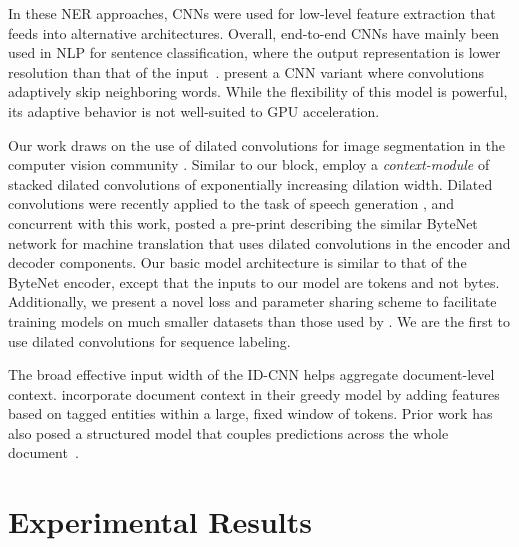 \documentclass[11pt,letterpaper]{article}
\begin{document}
In these NER approaches, CNNs were used for low-level feature extraction that feeds into alternative architectures. Overall, end-to-end CNNs have mainly been used in NLP for sentence classification, where the output representation is lower resolution than that of the input~\citet{kim2014convolutional,kalchbrenner2014convolutional,zhang2015character,toutanova2015representing}. \citet{lei2015molding} present a CNN variant where convolutions adaptively skip neighboring words. While the flexibility of this model is powerful, its adaptive behavior is not well-suited to GPU acceleration. 

Our work draws on the use of dilated convolutions for image segmentation in the computer vision community \citep{yu2015multi,chen2015semantic}. Similar to our block, \citet{yu2015multi} employ a 
\textit{context-module} of stacked dilated convolutions of exponentially increasing dilation width. Dilated convolutions were recently applied to the task of speech generation \citep{vandenoord2016wavenet}, and concurrent with this work, \citet{kalchbrenner2016neural} posted a pre-print describing the similar ByteNet network for machine translation that uses dilated convolutions in the encoder and decoder components. Our basic model architecture is similar to that of the ByteNet encoder, except that the inputs to our model are tokens and not bytes. Additionally, we present a novel loss and parameter sharing scheme to facilitate training models on much smaller datasets than those used by \citet{kalchbrenner2016neural}. We are the first to use dilated convolutions for sequence labeling. 








The broad effective input width of the ID-CNN helps aggregate document-level context. \citet{ratinov2009design} incorporate document context in their greedy model by adding features based on tagged entities within a large, fixed window of tokens.  Prior work has also posed a structured model that couples predictions across the whole document~\citep{bunescu2004collective,sutton2004collective,finkel2005incorporating}. 













%
 
\section{Experimental Results}
\end{document}
